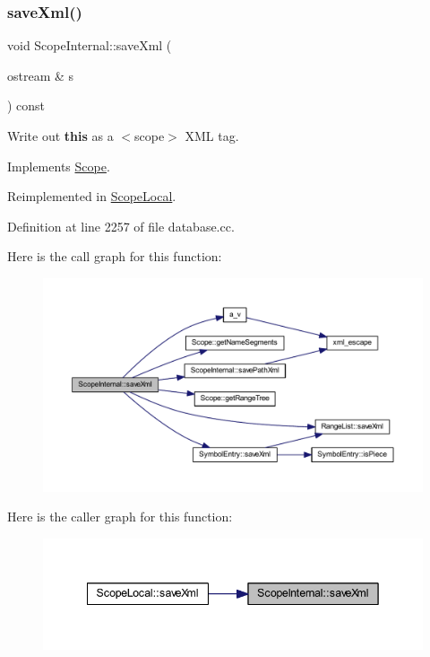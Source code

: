 \subsubsection{\texorpdfstring{saveXml()}{saveXml()}}
{\footnotesize\ttfamily void Scope\+Internal\+::save\+Xml (\begin{DoxyParamCaption}\item[{ostream \&}]{s }\end{DoxyParamCaption}) const\hspace{0.3cm}{\ttfamily [virtual]}}



Write out {\bfseries{this}} as a $<$scope$>$ X\+ML tag. 



Implements \mbox{\hyperlink{class_scope_a2583da1be37d68197dfbb0445fa1f3e0}{Scope}}.



Reimplemented in \mbox{\hyperlink{class_scope_local_a5ce828992aceb086c5bcc62d8cf2f3ae}{Scope\+Local}}.



Definition at line 2257 of file database.\+cc.

Here is the call graph for this function\+:
\nopagebreak
\begin{figure}[H]
\begin{center}
\leavevmode
\includegraphics[width=350pt]{class_scope_internal_af73cb738b4a29cf9aa076ce382ff110f_cgraph}
\end{center}
\end{figure}
Here is the caller graph for this function\+:
\nopagebreak
\begin{figure}[H]
\begin{center}
\leavevmode
\includegraphics[width=342pt]{class_scope_internal_af73cb738b4a29cf9aa076ce382ff110f_icgraph}
\end{center}
\end{figure}
\mbox{\label{class_scope_internal_a320fb817d3062994cb994e38a45fc0e1}} 
